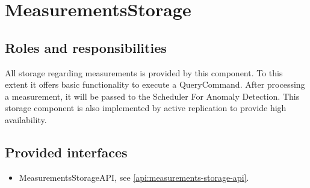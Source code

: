 \section{MeasurementsStorage}
\label{element:measurements-storage}

\subsection{Roles and responsibilities}

\npar All storage regarding measurements is provided by this component. To this
extent it offers basic functionality to execute a QueryCommand. After processing
a measurement, it will be passed to the Scheduler For Anomaly Detection. This
storage component is also implemented by active replication to provide high
availability.

\subsection{Provided interfaces}

\begin{itemize}
  \item MeasurementsStorageAPI, see \ref{api:measurements-storage-api}.
\end{itemize}



